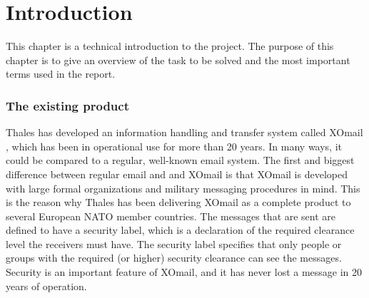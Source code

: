 \chapter{Introduction}

This chapter is a technical introduction to the project. The purpose of this chapter is to give an overview of the task to be solved and the most important terms used in the report.

\subsection*{The existing product}
Thales has developed an information handling and transfer system called XOmail \cite{bib:xomail}, which has been in operational use for more than 20 years. In many ways, it could be compared to a regular, well-known email system. The first and biggest difference between regular email and and XOmail is that XOmail is developed with large formal organizations and military messaging procedures in mind. This is the reason why Thales has been delivering XOmail as a complete product to several European NATO member countries.  
\newline
\newline
The messages that are sent are defined to have a security label, which is a declaration of the required clearance level the receivers must have. The security label specifies that only people or groups with the required (or higher) security clearance can see the messages. Security is an important feature of XOmail, and it has never lost a message in 20 years of operation. 

